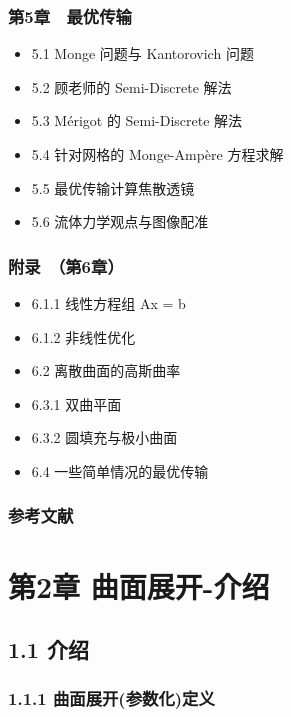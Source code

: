 \documentclass[
]{article}
\providecommand{\tightlist}{%
  \setlength{\itemsep}{0pt}\setlength{\parskip}{0pt}}
\begin{document}
\subsubsection{第5章　最优传输}\label{ux7b2c5ux7ae0-ux6700ux4f18ux4f20ux8f93}

\begin{itemize}
\tightlist
\item
  5.1 Monge 问题与 Kantorovich 问题
\item
  5.2 顾老师的 Semi-Discrete 解法
\item
  5.3 Mérigot 的 Semi-Discrete 解法
\item
  5.4 针对网格的 Monge-Ampère 方程求解
\item
  5.5 最优传输计算焦散透镜
\item
  5.6 流体力学观点与图像配准
\end{itemize}

\subsubsection{附录　（第6章）}\label{ux9644ux5f55-ux7b2c6ux7ae0}

\begin{itemize}
\tightlist
\item
  6.1.1 线性方程组 Ax = b
\item
  6.1.2 非线性优化
\item
  6.2 离散曲面的高斯曲率
\item
  6.3.1 双曲平面
\item
  6.3.2 圆填充与极小曲面
\item
  6.4 一些简单情况的最优传输
\end{itemize}

\subsubsection{参考文献}\label{ux53c2ux8003ux6587ux732e}

\section{第2章
曲面展开-介绍}\label{ux7b2c2ux7ae0-ux66f2ux9762ux5c55ux5f00-ux4ecbux7ecd}

\subsection{1.1 介绍}\label{ux4ecbux7ecd}

\subsubsection{1.1.1
曲面展开(参数化)定义}\label{ux66f2ux9762ux5c55ux5f00ux53c2ux6570ux5316ux5b9aux4e49}
\end{document}

